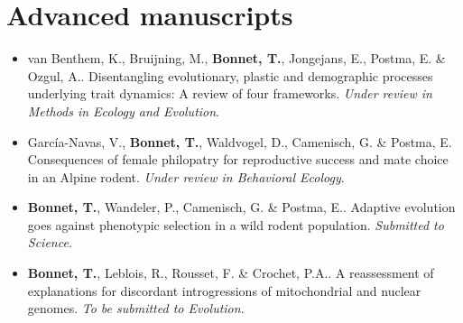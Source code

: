 \documentclass[a4paper,oneside,10pt]{article} %
\begin{document}
\section*{Advanced manuscripts}
\vspace{10pt}
\begin{itemize}
\item van Benthem, K., Bruijning, M., \textbf{Bonnet, T.}, Jongejans, E., Postma, E. \& Ozgul, A.. Disentangling evolutionary, plastic and demographic processes underlying trait dynamics: A review of four frameworks. \textit{Under review in Methods in Ecology and Evolution}.
\item García-Navas, V., \textbf{Bonnet, T.}, Waldvogel, D., Camenisch, G. \& Postma, E. Consequences of female philopatry for reproductive success and mate choice in an Alpine rodent. \textit{Under review in Behavioral Ecology}.
\item \textbf{Bonnet, T.}, Wandeler, P., Camenisch, G. \& Postma, E.. Adaptive evolution goes against phenotypic selection in a wild rodent population. \textit{Submitted to Science}.
\item \textbf{Bonnet, T.}, Leblois, R., Rousset, F. \& Crochet, P.A.. A reassessment of explanations for discordant introgressions of mitochondrial and nuclear genomes. \textit{To be submitted to Evolution}.
\end{itemize}
\end{document}
